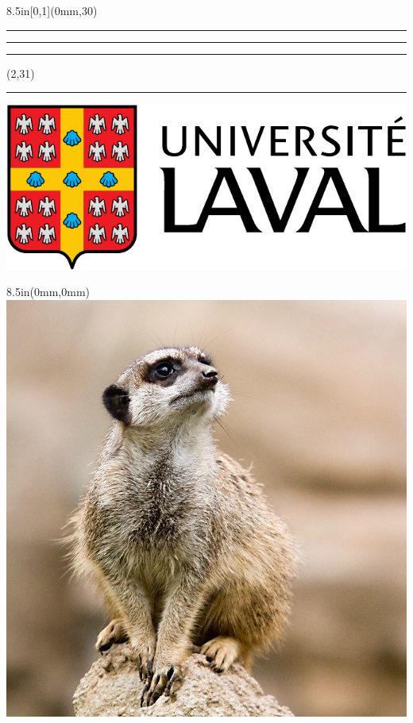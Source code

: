 \begingroup

\textblockorigin{0mm}{0mm}
\setlength{\parindent}{0mm}
\setlength{\banderougewidth}{2\TPHorizModule}
\setlength{\bandeorwidth}{\TPHorizModule}
\setlength{\imageheight}{29\TPVertModule}
\setlength{\gapwidth}{1.5pt}
\addtolength{\bandeorwidth}{-\gapwidth}
\addtolength{\imageheight}{-\gapwidth}

\begin{textblock*}{8.5in}[0,1](0mm,30\TPVertModule)
  \textcolor{rouge}{\rule{\banderougewidth}{\TPVertModule}}%
  \rule{\gapwidth}{0pt}%
  \textcolor{or}{\rule{\bandeorwidth}{\TPVertModule}}        %
\end{textblock*}

\begin{textblock*}{\TPHorizModule}(2\TPHorizModule,31\TPVertModule)
  \rule{\gapwidth}{0pt}%
  \includegraphics[height=2.5\TPVertModule,keepaspectratio=true]{ul_p}
\end{textblock*}

\begin{textblock*}{8.5in}(0mm,0mm)
  \includegraphics[height=\imageheight,keepaspectratio=true]{Suricata.jpg}
\end{textblock*}

